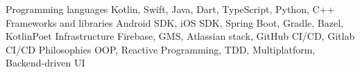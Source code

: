 \begin{cvskills}
    \cvskill
        {Programming languages}
        {Kotlin, Swift, Java, Dart, TypeScript, Python, C++}
    \cvskill
        {Frameworks and libraries} 
        {Android SDK, iOS SDK, Spring Boot, Gradle, Bazel, KotlinPoet}
    \cvskill
        {Infrastructure}
        {Firebase, GMS, Atlassian stack, GitHub CI/CD, Gitlab CI/CD}
    \cvskill
        {Philosophies}
        {OOP, Reactive Programming, TDD, Multiplatform, Backend-driven UI}
\end{cvskills}